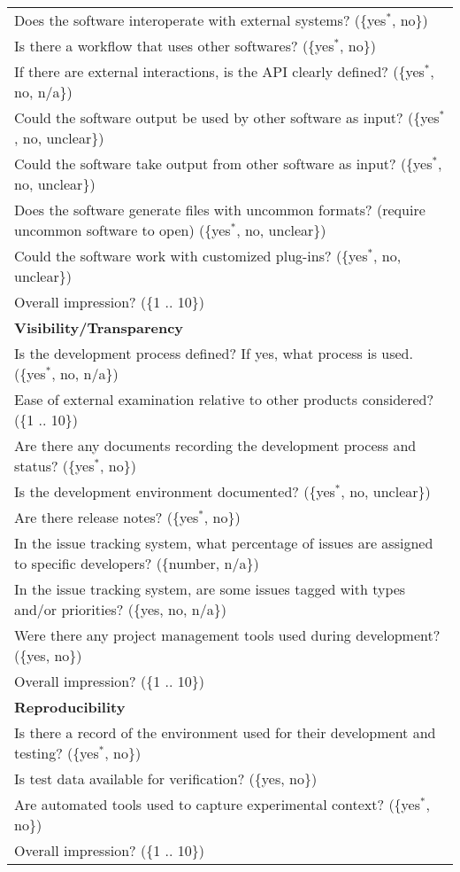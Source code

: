 \begin{longtable}{p{16cm}}
  Does the software interoperate with external systems? (\{yes$^*$, no\})\\
  Is there a workflow that uses other softwares? (\{yes$^*$, no\})\\
  If there are external interactions, is the API clearly defined? (\{yes$^*$, no, n/a\})\\
  Could the software output be used by other software as input? (\{yes$^*$, no, unclear\})\\
  Could the software take output from other software as input? (\{yes$^*$, no, unclear\})\\
  Does the software generate files with uncommon formats? (require uncommon software to open) (\{yes$^*$, no, unclear\})\\
  Could the software work with customized plug-ins? (\{yes$^*$, no, unclear\})\\
  Overall impression? (\{1 .. 10\})\\

  \midrule
  \textbf{Visibility/Transparency}\\
  \midrule

  Is the development process defined? If yes, what process is used. (\{yes$^*$, no, n/a\})\\
  Ease of external examination relative to other products
  considered?  (\{1 .. 10\})\\
  Are there any documents recording the development process and status? (\{yes$^*$, no\})\\ 
  Is the development environment documented? (\{yes$^*$, no, unclear\})\\
  Are there release notes? (\{yes$^*$, no\})\\
  In the issue tracking system, what percentage of issues are assigned to specific developers? (\{number, n/a\})\\
  In the issue tracking system, are some issues tagged with types and/or priorities? (\{yes, no, n/a\})\\
  Were there any project management tools used during development? (\{yes, no\})\\
  Overall impression? (\{1 .. 10\})\\

  \midrule
  \textbf{Reproducibility}\\
  \midrule

  Is there a record of the environment used for their development and testing?
  (\{yes$^*$, no\})\\
  Is test data available for verification?  (\{yes, no\})\\
  Are automated tools used to capture experimental context? (\{yes$^*$, no\})\\
  Overall impression? (\{1 .. 10\})\\

  \bottomrule

\end{longtable}
